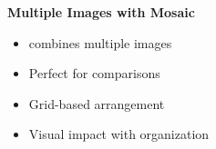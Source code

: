 \documentclass[aspectratio=169]{beamer}
\begin{document}
\begin{frame}{\Large\textbf{Multiple Images with Mosaic}}
\begin{center}
    \end{center}
    \vspace{0.5em}
    \begin{itemize}
        \item {} combines multiple images
        \item Perfect for comparisons
        \item Grid-based arrangement
        \item Visual impact with organization
    \end{itemize}
\end{frame}
\end{document}
